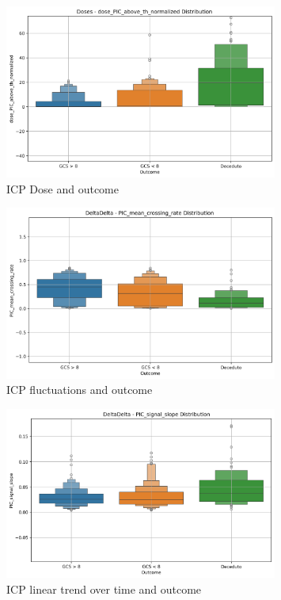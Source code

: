 \begin{figure}[h!]
    \centering
    \includegraphics[width=0.8\textwidth]{pictures/fig9_ICPdose.png}
    \caption{ICP Dose and outcome} %
    \label{fig:ICPdose_outcome} %
\end{figure}

\begin{figure}[h!]
    \centering
    \includegraphics[width=0.8\textwidth]{pictures/fig10_ICPfluctuations.png}
    \caption{ICP fluctuations and outcome} %
    \label{fig:ICPfluctuations_outcome} %
\end{figure}

\begin{figure}[h!]
    \centering
    \includegraphics[width=0.8\textwidth]{pictures/fig11_ICPslope.png}
    \caption{ICP linear trend over time and outcome} %
    \label{fig:ICPslope_outcome} %
\end{figure}

